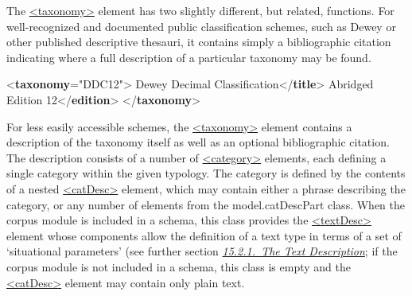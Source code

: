  The \hyperref[TEI.taxonomy]{<taxonomy>} element has two slightly different, but related, functions. For well-recognized and documented public classification schemes, such as Dewey or other published descriptive thesauri, it contains simply a bibliographic citation indicating where a full description of a particular taxonomy may be found. \par\bgroup{}\exampleFont \begin{shaded}\noindent\mbox{}{<\textbf{taxonomy}\hspace*{1em}{xml:id}="{DDC12}">}\mbox{}\newline 
{}\mbox{}\newline 
\hspace*{1em}Dewey Decimal Classification{</\textbf{title}>}\mbox{}\newline 
\hspace*{1em}Abridged Edition 12{</\textbf{edition}>}\mbox{}\newline 
{}\mbox{}\newline 
{</\textbf{taxonomy}>}\end{shaded}\egroup\par \noindent  For less easily accessible schemes, the \hyperref[TEI.taxonomy]{<taxonomy>} element contains a description of the taxonomy itself as well as an optional bibliographic citation. The description consists of a number of \hyperref[TEI.category]{<category>} elements, each defining a single category within the given typology. The category is defined by the contents of a nested \hyperref[TEI.catDesc]{<catDesc>} element, which may contain either a phrase describing the category, or any number of elements from the \textsf{model.catDescPart} class. When the corpus module is included in a schema, this class provides the \hyperref[TEI.textDesc]{<textDesc>} element whose components allow the definition of a text type in terms of a set of ‘situational parameters’ (see further section \textit{\hyperref[CCAHTD]{15.2.1.\ The Text Description}}; if the corpus module is not included in a schema, this class is empty and the \hyperref[TEI.catDesc]{<catDesc>} element may contain only plain text.\par
